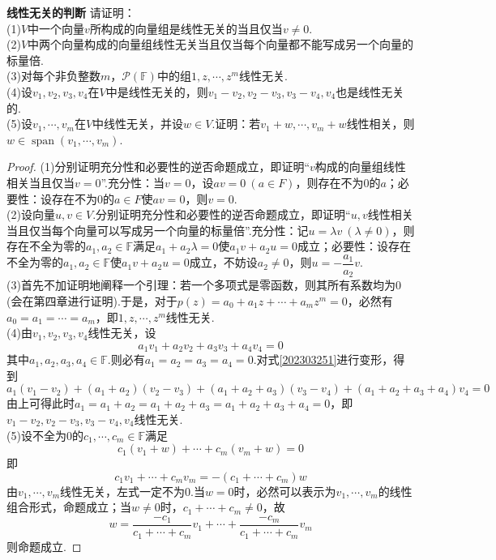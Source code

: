 \documentclass[lang=cn, zihao=5]{elegantbook}
\newcommand{\F}{\mathbb{F}}
\DeclareMathOperator{\spn}{span}
\newcommand{\examplefont}[1]{\color{mgreen} \textbf{#1}}
\begin{document}
\begin{example}{\examplefont{线性无关的判断}}
	请证明： \\
	(1)$V$中一个向量$v$所构成的向量组是线性无关的当且仅当$v \neq 0$. \\
	(2)$V$中两个向量构成的向量组线性无关当且仅当每个向量都不能写成另一个向量的标量倍. \\
	(3)对每个非负整数$m$，$\mathcal{P} (\F)$中的组$1,z, \cdots ,z^m$线性无关. \\
	(4)设$v_1,v_2,v_3,v_4$在$V$中是线性无关的，则$v_1-v_2,v_2-v_3,v_3-v_4,v_4$也是线性无关的. \\
	(5)设$v_1, \cdots ,v_m$在$V$中线性无关，并设$w \in V$.证明：若$v_1+w , \cdots ,v_m+w$线性相关，则$w \in \spn (v_1 , \cdots ,v_m)$.
\end{example}
\begin{proof}
	(1)分别证明充分性和必要性的逆否命题成立，即证明“$v$构成的向量组线性相关当且仅当$v=0$”.充分性：当$v=0$，设$av=0~(a\in F )$，则存在不为$0$的$a$；必要性：设存在不为$0$的$a\in F$使$av=0$，则$v=0$. \\
	(2)设向量$u,v \in V$.分别证明充分性和必要性的逆否命题成立，即证明“$u,v$线性相关当且仅当每个向量可以写成另一个向量的标量倍”.充分性：记$u=\lambda v~(\lambda \neq 0)$，则存在不全为零的$a_1,a_2 \in \F $满足$a_1+a_2 \lambda =0$使$a_1v+a_2 u =0$成立；必要性：设存在不全为零的$a_1,a_2 \in \F $使$a_1 v + a_2 u=0$成立，不妨设$a_2 \neq 0$，则$u=-\dfrac{a_1}{a_2}v$. \\
	(3)首先不加证明地阐释一个引理：若一个多项式是零函数，则其所有系数均为$0$(会在第四章进行证明).于是，对于$p(z)=a_0+a_1z+ \cdots +a_mz^m=0$，必然有$a_0=a_1= \cdots =a_m$，即$1,z,\cdots ,z^m$线性无关. \\
	(4)由$v_1,v_2,v_3,v_4$线性无关，设\begin{equation}
		a_1v_1+a_2v_2+a_3v_3+a_4v_4=0 \label{202303251}
	\end{equation}
	其中$a_1,a_2,a_3,a_4 \in \F $.则必有$a_1=a_2=a_3=a_4=0$.对式\ref{202303251}进行变形，得到$$a_1(v_1-v_2)+(a_1+a_2)(v_2-v_3)+(a_1+a_2+a_3)(v_3-v_4)+(a_1+a_2+a_3+a_4)v_4=0$$
	由上可得此时$a_1=a_1+a_2=a_1+a_2+a_3=a_1+a_2+a_3+a_4=0$，即$v_1-v_2,v_2-v_3,v_3-v_4,v_4$线性无关. \\
	(5)设不全为$0$的$c_1,\cdots ,c_m \in \F $满足$$c_1(v_1+w)+ \cdots + c_m(v_m+w)=0$$
	即$$c_1v_1+ \cdots + c_mv_m = -(c_1+ \cdots + c_m)w$$
	由$v_1,\cdots ,v_m$线性无关，左式一定不为$0$.当$w=0$时，必然可以表示为$v_1,\cdots ,v_m$的线性组合形式，命题成立；当$w \neq 0$时，$c_1+ \cdots + c_m \neq 0$，故$$w=\frac{-c_1}{c_1+ \cdots + c_m}v_1 + \cdots + \frac{-c_m}{c_1+ \cdots + c_m}v_m$$
	则命题成立.
\end{proof}
\end{document}
